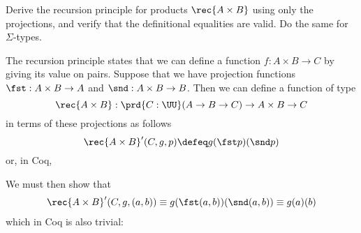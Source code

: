                       
              
\nwendcode{}%
  Derive the recursion principle for products $\rec{A
  \times B}$ using only the projections, and verify that the definitional
equalities are valid.  Do the same for $\Sigma$-types.

\soln The recursion principle states that we can define a function $f : A
\times B \to C$ by giving its value on pairs.  Suppose that we have projection
functions $\fst : A \times B \to A$ and $\snd : A \times B \to B$.  Then we can
define a function of type
\[
  \rec{A\times B} : \prd{C : \UU} (A \to B \to C) \to A \times B \to C
\]
in terms of these projections as follows
\[
  \rec{A \times B}'(C, g, p) \defeq 
  g(\fst p)(\snd p)
\]
or, in Coq,

\nwenddocs{}\endmoddef
{}                 
        

\nwendcode{}We must then show that
\begin{align*}
  \rec{A\times B}'(C, g, (a, b)) 
  \equiv g(\fst (a, b))(\snd (a, b))
  \equiv g(a)(b)
\end{align*}
which in Coq is also trivial:

\nwenddocs{}\plusendmoddef
{}                

